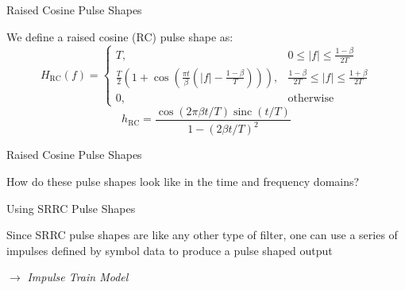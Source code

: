 \documentclass[10pt]{beamer}
\DeclareMathOperator{\sinc}{sinc}
\begin{document}

\begin{frame}[fragile]{Raised Cosine Pulse Shapes}

We define a raised cosine (RC) pulse shape as:
\begin{equation}
 H_{\mathrm{RC}}(f)=
 \begin{cases}
  T,& 0\le{|f|}\le\frac{1-\beta}{2T}\\
  \frac{T}{2}\left(1+\cos{\left(\frac{\pi{t}}{\beta}\left(|f|-\frac{1-\beta}{T}\right)\right)}\right),&\frac{1-\beta}{2T}\le{|f|}\le\frac{1+\beta}{2T}\\
  0,&\mathrm{otherwise}
 \end{cases}
\end{equation}
\begin{equation}
 h_{\mathrm{RC}}=\frac{\cos(2\pi\beta{t}/T)\sinc(t/T)}{1-(2\beta{t}/T)^2}
\end{equation}

\end{frame}



\begin{frame}[fragile]{Raised Cosine Pulse Shapes}

\centering

How do these pulse shapes look like in the time and frequency domains?
 
\end{frame}



\begin{frame}[fragile]{Using SRRC Pulse Shapes}


Since SRRC pulse shapes are like any other type of filter, one can use a series of impulses defined by symbol data to produce a pulse shaped output

$\rightarrow$ \textit{Impulse Train Model}
 
\end{frame}


\end{document}
